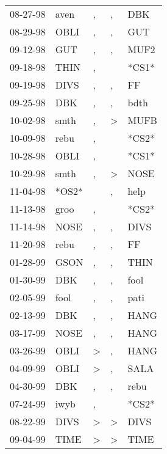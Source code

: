\begin{supertabular}{lllll}
 08-27-98 &   aven &             , &             , &    DBK \\
 08-29-98 &   OBLI &             , &             , &    GUT \\
 09-12-98 &    GUT &             , &             , &   MUF2 \\
 09-18-98 &   THIN &             , &               &  *CS1* \\
 09-19-98 &   DIVS &             , &             , &     FF \\
 09-25-98 &    DBK &             , &             , &   bdth \\
 10-02-98 &   smth &             , &  \textgreater &   MUFB \\
 10-09-98 &   rebu &             , &               &  *CS2* \\
 10-28-98 &   OBLI &             , &               &  *CS1* \\
 10-29-98 &   smth &             , &  \textgreater &   NOSE \\
 11-04-98 &  *OS2* &               &             , &   help \\
 11-13-98 &   groo &             , &               &  *CS2* \\
 11-14-98 &   NOSE &             , &             , &   DIVS \\
 11-20-98 &   rebu &             , &             , &     FF \\
 01-28-99 &   GSON &             , &             , &   THIN \\
 01-30-99 &    DBK &             , &             , &   fool \\
 02-05-99 &   fool &             , &             , &   pati \\
 02-13-99 &    DBK &             , &             , &   HANG \\
 03-17-99 &   NOSE &             , &             , &   HANG \\
 03-26-99 &   OBLI &  \textgreater &             , &   HANG \\
 04-09-99 &   OBLI &  \textgreater &             , &   SALA \\
 04-30-99 &    DBK &             , &             , &   rebu \\
 07-24-99 &   iwyb &             , &               &  *CS2* \\
 08-22-99 &   DIVS &  \textgreater &  \textgreater &   DIVS \\
 09-04-99 &   TIME &  \textgreater &  \textgreater &   TIME \\

\end{supertabular}
